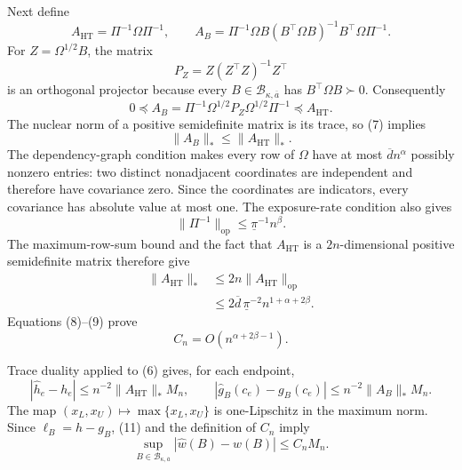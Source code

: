 Next define
\[
A_{\mathrm{HT}}=\Pi^{-1}\Omega\Pi^{-1},
\qquad
A_B=\Pi^{-1}\Omega B(B^{\top}\Omega B)^{-1}B^{\top}\Omega\Pi^{-1}.
\tag{6}
\]
For \(Z=\Omega^{1/2}B\), the matrix
\[
P_Z=Z(Z^{\top}Z)^{-1}Z^{\top}
\]
is an orthogonal projector because every \(B\in\mathcal B_{\kappa,\overline a}\) has \(B^{\top}\Omega B\succ0\).  Consequently
\[
0\preceq A_B
=\Pi^{-1}\Omega^{1/2}P_Z\Omega^{1/2}\Pi^{-1}
\preceq A_{\mathrm{HT}}.
\tag{7}
\]
The nuclear norm of a positive semidefinite matrix is its trace, so (7) implies
\[
\lVert A_B\rVert_*\le\lVert A_{\mathrm{HT}}\rVert_*.
\tag{8}
\]
The dependency-graph condition makes every row of \(\Omega\) have at most \(\overline d n^\alpha\) possibly nonzero entries: two distinct nonadjacent coordinates are independent and therefore have covariance zero.  Since the coordinates are indicators, every covariance has absolute value at most one.  The exposure-rate condition also gives
\[
\lVert\Pi^{-1}\rVert_{\mathrm{op}}
\le\underline\pi^{-1}n^\beta.
\]
The maximum-row-sum bound and the fact that \(A_{\mathrm{HT}}\) is a \(2n\)-dimensional positive semidefinite matrix therefore give
\[
\begin{aligned}
\lVert A_{\mathrm{HT}}\rVert_*
&\le2n\lVert A_{\mathrm{HT}}\rVert_{\mathrm{op}}\\
&\le2\overline d\,\underline\pi^{-2}
n^{1+\alpha+2\beta}.
\end{aligned}
\tag{9}
\]
Equations (8)--(9) prove
\[
C_n=O(n^{\alpha+2\beta-1}).
\tag{10}
\]

Trace duality applied to (6) gives, for each endpoint,
\[
|\widehat h_e-h_e|
\le n^{-2}\lVert A_{\mathrm{HT}}\rVert_*M_n,
\qquad
|\widehat g_B(c_e)-g_B(c_e)|
\le n^{-2}\lVert A_B\rVert_*M_n.
\tag{11}
\]
The map \((x_L,x_U)\mapsto\max\{x_L,x_U\}\) is one-Lipschitz in the maximum norm.  Since \(\ell_B=h-g_B\), (11) and the definition of \(C_n\) imply
\[
\sup_{B\in\mathcal B_{\kappa,\overline a}}
|\widehat w(B)-w(B)|\le C_nM_n.
\tag{12}
\]

